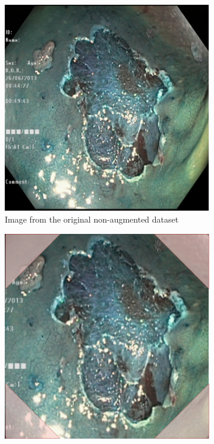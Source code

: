 \begin{figure}[h!]
     \centering
     \begin{subfigure}[t]{0.4\textwidth}
         \centering
         \includegraphics[width=\textwidth]{methodology/figures/nomask.png}
         \caption{Image from the original non-augmented dataset}
         \label{fig:CornerMask}
     \end{subfigure}
     \hfill
     \begin{subfigure}[t]{0.4\textwidth}
         \centering
         \includegraphics[width=\textwidth]{methodology/figures/cornermask.png}

\end{subfigure}
\end{figure}
